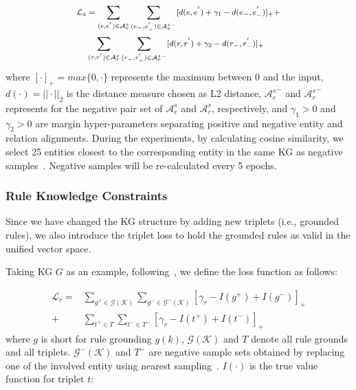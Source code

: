 \documentclass[11pt,a4paper]{article}
\begin{document}
\begin{equation}
	{\footnotesize
		\begin{split}
			\mathcal{L}_a &= \sum_{(e, e^{'}) \in \mathcal{A}_e^s} \sum_{(e_{-}, e_{-}^{'}) \in {\mathcal{A}_e^s}^{-}}[d(e, e^{'}) + \gamma_1 - d(e_{-}, e_{-}^{'})]_{+} + \\
			& \sum_{(r, r^{'}) \in \mathcal{A}_r^s} \sum_{(r_{-}, r_{-}^{'}) \in {\mathcal{A}_r^s}^{-}}[d(r, r^{'}) + \gamma_2 - d(r_{-}, r_{-}^{'})]_{+}
		\end{split}}
\end{equation}
where $[\cdot]_{+} = max\{0, \cdot\}$ represents the maximum between 0 and the input, $d(\cdot) = ||\cdot||_2$ is the distance measure chosen as L2 distance, ${\mathcal{A}_e^s}^{-}$ and ${\mathcal{A}_r^s}^{-}$ represents for the negative pair set of $\mathcal{A}_e^s$ and $\mathcal{A}_r^s$, respectively, and $\gamma_1 > 0$ and $\gamma_2 > 0$ are margin hyper-parameters separating positive and negative entity and relation alignments. During the experiments, by calculating cosine similarity, we select 25 entities closest to the corresponding entity in the same KG as negative samples~\cite{sun2018bootstrapping}. Negative samples will be re-calculated every 5 epochs.


\subsubsection*{Rule Knowledge Constraints}
Since we have changed the KG structure by adding new triplets (i.e., grounded rules), we also introduce the triplet loss to hold the grounded rules as valid in the unified vector space.

Taking KG $G$ as an example, following~, we define the loss function as follows:

\begin{equation}
	\begin{split}
		\mathcal{L}_r = & \underset{g^+\in\mathcal{G}(\mathcal{K})}{\sum} \underset{g^-\in\mathcal{G}^-(\mathcal{K})}{\sum} [\gamma_r-I(g^+)+I(g^-)]_+ \\
		+ & \underset{t^+\in T}{\sum} \underset{t^-\in T^-}{\sum} [\gamma_r-I(t^+)+I(t^-)]_+
	\end{split}
\end{equation}
where $g$ is short for rule grounding $g(k)$, $\mathcal{G}(\mathcal{K})$ and $T$ denote all rule grounds and all triplets. $\mathcal{G}^-(\mathcal{K})$ and $T^-$ are negative sample sets obtained by replacing one of the involved entity using nearest sampling~\cite{sun2018bootstrapping}. $I(\cdot)$ is the true value function for triplet $t$:
\end{document}
